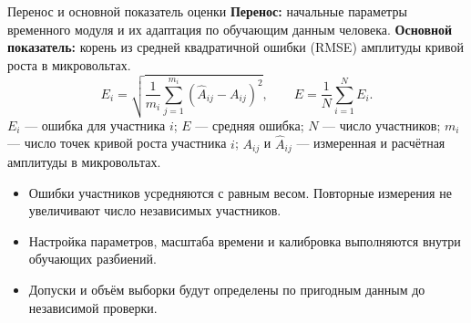 \begin{frame}{Перенос и основной показатель оценки}
\textbf{Перенос:} начальные параметры временного модуля и их адаптация по обучающим данным человека.
\SlideGap
\textbf{Основной показатель:} корень из средней квадратичной ошибки (RMSE) амплитуды кривой роста в микровольтах.
\[
 E_i=\sqrt{\frac{1}{m_i}\sum_{j=1}^{m_i}(\widehat A_{ij}-A_{ij})^2},
 \qquad E=\frac{1}{N}\sum_{i=1}^{N}E_i.
\]
\noindent $E_i$ --- ошибка для участника $i$; $E$ --- средняя ошибка; $N$ --- число участников; $m_i$ --- число точек кривой роста участника $i$; $A_{ij}$ и $\widehat A_{ij}$ --- измеренная и расчётная амплитуды в микровольтах.
\SlideGap
\begin{itemize}
\item Ошибки участников усредняются с равным весом. Повторные измерения не увеличивают число независимых участников.
\item Настройка параметров, масштаба времени и калибровка выполняются внутри обучающих разбиений.
\item Допуски и объём выборки будут определены по пригодным данным до независимой проверки.
\end{itemize}
\end{frame}
